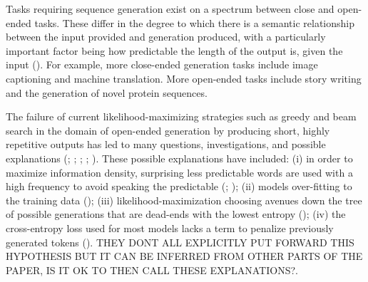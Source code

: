 \documentclass{article}
\begin{document}
Tasks requiring sequence generation exist on a spectrum between close and open-ended tasks. These differ in the degree to which there is a semantic relationship between the input provided and generation produced, with a particularly important factor being how predictable the length of the output is, given the input (\cite{BeamLengthAdjustment}). For example, more close-ended generation tasks include image captioning and machine translation. More open-ended tasks include story writing and the generation of novel protein sequences.

The failure of current likelihood-maximizing strategies such as greedy and beam search in the domain of open-ended generation by producing short, highly repetitive outputs has led to many questions, investigations, and possible explanations (\cite{Nucleus}; \cite{HUSE}; \cite{radford2019language}; \cite{BeamLengthAdjustment}; \cite{UnLikelihood}). These possible explanations have included: (i) in order to maximize information density, surprising less predictable words are used with a high frequency to avoid speaking the predictable (\cite{Nucleus}; \cite{grice1975logic}); (ii) models over-fitting to the training data (\cite{HUSE});  (iii) likelihood-maximization choosing avenues down the tree of possible generations that are dead-ends with the lowest entropy (\cite{BeamLengthAdjustment}); (iv) the cross-entropy loss used for most models lacks a term to penalize previously generated tokens (\cite{UnLikelihood}). THEY DONT ALL EXPLICITLY PUT FORWARD THIS HYPOTHESIS BUT IT CAN BE INFERRED FROM OTHER PARTS OF THE PAPER, IS IT OK TO THEN CALL THESE EXPLANATIONS?. 
\end{document}
